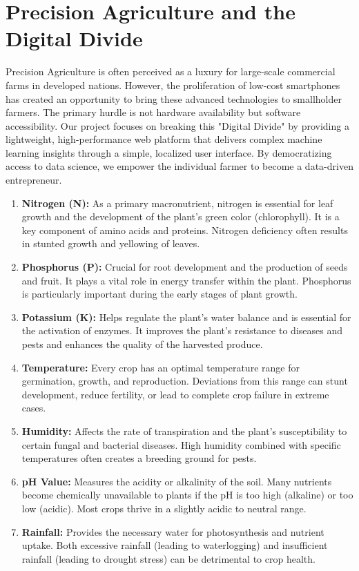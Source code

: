 \documentclass[12pt,a4paper]{report}
\begin{document}
\section{Precision Agriculture and the Digital Divide}
Precision Agriculture is often perceived as a luxury for large-scale commercial farms in developed nations. However, the proliferation of low-cost smartphones has created an opportunity to bring these advanced technologies to smallholder farmers. The primary hurdle is not hardware availability but software accessibility. Our project focuses on breaking this "Digital Divide" by providing a lightweight, high-performance web platform that delivers complex machine learning insights through a simple, localized user interface. By democratizing access to data science, we empower the individual farmer to become a data-driven entrepreneur.

\begin{enumerate}
    \item \textbf{Nitrogen (N):} As a primary macronutrient, nitrogen is essential for leaf growth and the development of the plant's green color (chlorophyll). It is a key component of amino acids and proteins. Nitrogen deficiency often results in stunted growth and yellowing of leaves.
    \item \textbf{Phosphorus (P):} Crucial for root development and the production of seeds and fruit. It plays a vital role in energy transfer within the plant. Phosphorus is particularly important during the early stages of plant growth.
    \item \textbf{Potassium (K):} Helps regulate the plant's water balance and is essential for the activation of enzymes. It improves the plant's resistance to diseases and pests and enhances the quality of the harvested produce.
    \item \textbf{Temperature:} Every crop has an optimal temperature range for germination, growth, and reproduction. Deviations from this range can stunt development, reduce fertility, or lead to complete crop failure in extreme cases.
    \item \textbf{Humidity:} Affects the rate of transpiration and the plant's susceptibility to certain fungal and bacterial diseases. High humidity combined with specific temperatures often creates a breeding ground for pests.
    \item \textbf{pH Value:} Measures the acidity or alkalinity of the soil. Many nutrients become chemically unavailable to plants if the pH is too high (alkaline) or too low (acidic). Most crops thrive in a slightly acidic to neutral range.
    \item \textbf{Rainfall:} Provides the necessary water for photosynthesis and nutrient uptake. Both excessive rainfall (leading to waterlogging) and insufficient rainfall (leading to drought stress) can be detrimental to crop health.
\end{enumerate}
\end{document}
